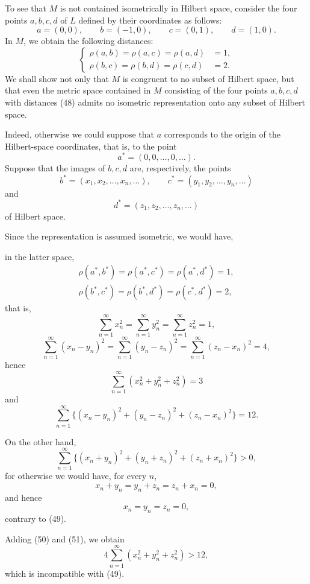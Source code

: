 \documentclass[a4paper,12pt]{amsart}
\newcommand{\srcpage}[1]{} %
\begin{document}
To see that $M$ is not contained isometrically in Hilbert space, consider the four points $a,b,c,d$ of $L$ defined by their coordinates as follows:
\[a=(0,0),\qquad b=(-1,0),\qquad c=(0,1),\qquad d=(1,0).\]
In $M$, we obtain the following distances:
\begin{equation}
\left\{\begin{aligned}\rho(a,b)=\rho(a,c)=\rho(a,d)&=1,\\\rho(b,c)=\rho(b,d)=\rho(c,d)&=2.\end{aligned}\right.\tag{48}
\end{equation}
We shall show not only that $M$ is congruent to no subset of Hilbert space, but that even the metric space contained in $M$ consisting of the four points $a,b,c,d$ with distances (48) admits no isometric representation onto any subset of Hilbert space.

Indeed, otherwise we could suppose that $a$ corresponds to the origin of the Hilbert-space coordinates, that is, to the point
\[a^*=(0,0,\ldots,0,\ldots).\]
Suppose that the images of $b,c,d$ are, respectively, the points
\[b^*=(x_1,x_2,\ldots,x_n,\ldots),\qquad c^*=(y_1,y_2,\ldots,y_n,\ldots)\]
and
\[d^*=(z_1,z_2,\ldots,z_n,\ldots)\]
of Hilbert space.

Since the representation is assumed isometric, we would have,
\srcpage{90}
in the latter space,
\[
\begin{gathered}
\rho(a^*,b^*)=\rho(a^*,c^*)=\rho(a^*,d^*)=1,\\
\rho(b^*,c^*)=\rho(b^*,d^*)=\rho(c^*,d^*)=2,
\end{gathered}
\]
that is,
\[
\sum_{n=1}^{\infty}x_n^2=\sum_{n=1}^{\infty}y_n^2=\sum_{n=1}^{\infty}z_n^2=1,
\]
\[
\sum_{n=1}^{\infty}(x_n-y_n)^2=\sum_{n=1}^{\infty}(y_n-z_n)^2=\sum_{n=1}^{\infty}(z_n-x_n)^2=4,
\]
hence
\begin{equation}\sum_{n=1}^{\infty}(x_n^2+y_n^2+z_n^2)=3\tag{49}\end{equation}
and
\begin{equation}\sum_{n=1}^{\infty}\{(x_n-y_n)^2+(y_n-z_n)^2+(z_n-x_n)^2\}=12.\tag{50}\end{equation}
\begin{samepage}
On the other hand,
\begin{equation}\sum_{n=1}^{\infty}\{(x_n+y_n)^2+(y_n+z_n)^2+(z_n+x_n)^2\}>0,\tag{51}\end{equation}
for otherwise we would have, for every $n$,
\[x_n+y_n=y_n+z_n=z_n+x_n=0,\]
and hence
\[x_n=y_n=z_n=0,\]
contrary to (49).

Adding (50) and (51), we obtain
\[4\sum_{n=1}^{\infty}(x_n^2+y_n^2+z_n^2)>12,\]
which is incompatible with (49).
\end{samepage}
\end{document}
